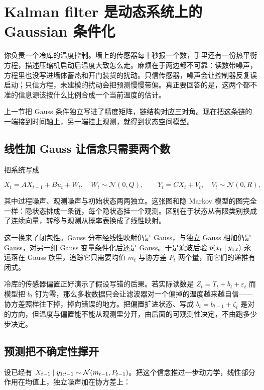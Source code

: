 \section{Kalman filter 是动态系统上的 Gaussian 条件化}
\label{sec:13-Machine-Learning/07-Graphical-and-Sequential-Models/03}

你负责一个冷库的温度控制。墙上的传感器每十秒报一个数，手里还有一份热平衡方程，描述压缩机启动后温度大致怎么走。麻烦在于两边都不可靠：读数带噪声，方程里也没写进墙体蓄热和开门装货的扰动。只信传感器，噪声会让控制器反复误启动；只信方程，未建模的扰动会把预测慢慢带偏。真正要回答的是，这两个都不准的信息源该按什么比例合成一个当前温度的估计。

上一节把 Gauss 条件独立写进了精度矩阵，链结构对应三对角。现在把这条链的一端接到时间轴上，另一端挂上观测，就得到状态空间模型。

\subsection{线性加 Gauss 让信念只需要两个数}

把系统写成

\[
X_t=AX_{t-1}+Bu_t+W_t,\quad W_t\sim\mathcal N(0,Q),
\qquad
Y_t=CX_t+V_t,\quad V_t\sim\mathcal N(0,R),
\]

其中过程噪声、观测噪声与初始状态两两独立。这张图和隐 Markov 模型的图完全一样：隐状态排成一条链，每个隐状态挂一个观测。区别在于状态从有限类别换成了连续向量，转移与观测从概率表换成了线性映射。

这一换来了闭包性。Gauss 分布经线性映射仍是 Gauss，与独立 Gauss 相加仍是 Gauss，对另一组 Gauss 变量条件化后还是 Gauss。于是滤波后验 \(p(x_t\mid y_{1:t})\) 永远落在 Gauss 族里，追踪它只需要均值 \(m_t\) 与协方差 \(P_t\) 两个量，而它们的递推有闭式。

冷库的传感器偏置正好演示了假设写错的后果。若实际读数是 \(Z_t=T_t+b_t+\varepsilon_t\) 而模型把 \(b_t\) 钉为零，那么多收数据只会让滤波器对一个偏掉的温度越来越自信——协方差照样往下掉，掉向错误的地方。把偏置扩进状态、写成 \(b_t=b_{t-1}+\zeta_t\) 是对的方向，但温度与偏置能不能从观测里分开，由后面的可观测性决定，不由跑多少步决定。

\subsection{预测把不确定性撑开}

设已经有 \(X_{t-1}\mid y_{1:t-1}\sim\mathcal N(m_{t-1},P_{t-1})\)。把这个信念推过一步动力学，线性部分作用在均值上，独立噪声加在协方差上：

